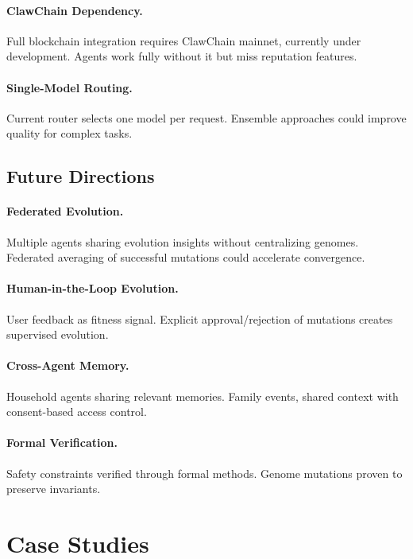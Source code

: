 \documentclass[conference]{IEEEtran}
\begin{document}
\paragraph{ClawChain Dependency.} Full blockchain integration requires ClawChain mainnet, currently under development. Agents work fully without it but miss reputation features.

\paragraph{Single-Model Routing.} Current router selects one model per request. Ensemble approaches could improve quality for complex tasks.

\subsection{Future Directions}

\paragraph{Federated Evolution.} Multiple agents sharing evolution insights without centralizing genomes. Federated averaging of successful mutations could accelerate convergence.

\paragraph{Human-in-the-Loop Evolution.} User feedback as fitness signal. Explicit approval/rejection of mutations creates supervised evolution.

\paragraph{Cross-Agent Memory.} Household agents sharing relevant memories. Family events, shared context with consent-based access control.

\paragraph{Formal Verification.} Safety constraints verified through formal methods. Genome mutations proven to preserve invariants.



\section{Case Studies}
\label{sec:casestudies}
\end{document}
